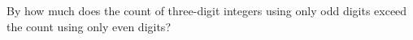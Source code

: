 By how much does the count of three-digit integers using only odd digits exceed the count using only even digits?

